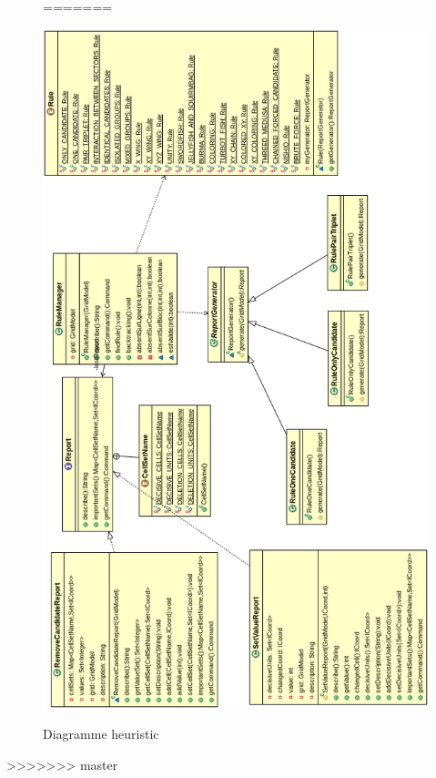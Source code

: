 \begin{figure}[ht]
=======
  \caption{\label{annexe18} Diagramme heuristic}
  \includegraphics [width=140mm]{images/heuristic.png} \\[0.5cm]
\end{figure}

>>>>>>> master


